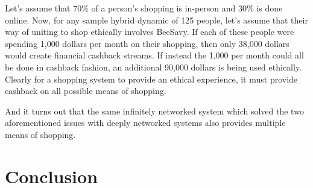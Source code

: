 \documentclass{article}%
\begin{document}
Let's assume that 70\% of a person's shopping is in-person and 30\% is done online. Now, for any sample hybrid dynamic of 125 people, let's assume that their way of uniting to shop ethically involves BeeSavy. If each of these people were spending 1,000 dollars per month on their shopping, then only 38,000 dollars would create financial cashback streams. If instead the 1,000 per month could all be done in cashback fashion, an additional 90,000 dollars is being used ethically. Clearly for a shopping system to provide an ethical experience, it must provide cashback on all possible means of shopping.

And it turns out that the same infinitely networked system which solved the two aforementioned issues with deeply networked systems also provides multiple means of shopping.

\section{Conclusion}
\end{document}
